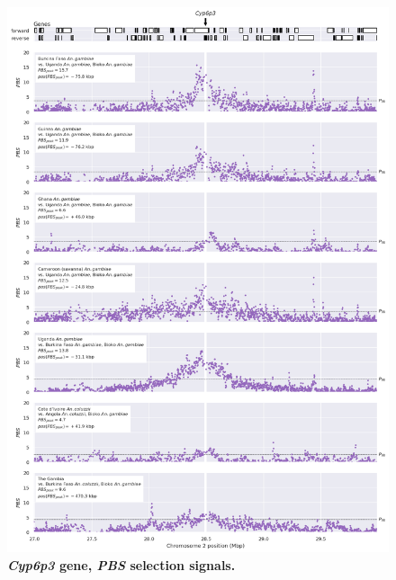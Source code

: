 \documentclass[a4paper,11pt,abstracton,hidelinks]{scrartcl}
\begin{document}
\clearpage
\begin{figure}[t!]
	\begin{center}
		\includegraphics*[width=1\linewidth,center]{artwork/locus_cyp6p3_pbs_pdist.png}
	\end{center}
	\caption[\textit{Cyp6p3} gene, \textit{PBS} selection signals]{
	\textbf{\textit{Cyp6p3} gene, \textit{PBS} selection signals.} 
	} 
	\label{fig:locus_cyp6p3_pbs}
\end{figure}


\clearpage
\end{document}
